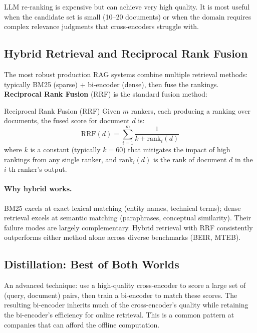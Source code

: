 LLM re-ranking is expensive but can achieve very high quality.  It is most
useful when the candidate set is small (10--20 documents) or when the domain
requires complex relevance judgments that cross-encoders struggle with.

\subsection{Hybrid Retrieval and Reciprocal Rank Fusion}

The most robust production RAG systems combine multiple retrieval methods:
typically BM25 (sparse) + bi-encoder (dense), then fuse the rankings.
\textbf{Reciprocal Rank Fusion} (RRF) is the standard fusion method:

\begin{mathresult}{Reciprocal Rank Fusion (RRF)}
Given $m$ rankers, each producing a ranking over documents, the fused score for
document $d$ is:
\[
    \text{RRF}(d) = \sum_{i=1}^{m} \frac{1}{k + \text{rank}_i(d)}
\]
where $k$ is a constant (typically $k = 60$) that mitigates the impact of high
rankings from any single ranker, and $\text{rank}_i(d)$ is the rank of document
$d$ in the $i$-th ranker's output.
\end{mathresult}

\paragraph{Why hybrid works.}
BM25 excels at exact lexical matching (entity names, technical terms); dense
retrieval excels at semantic matching (paraphrases, conceptual similarity).
Their failure modes are largely complementary.  Hybrid retrieval with RRF
consistently outperforms either method alone across diverse benchmarks (BEIR,
MTEB).

\subsection{Distillation: Best of Both Worlds}

An advanced technique: use a high-quality cross-encoder to score a large set
of (query, document) pairs, then train a bi-encoder to match these scores.
The resulting bi-encoder inherits much of the cross-encoder's quality while
retaining the bi-encoder's efficiency for online retrieval.  This is a common
pattern at companies that can afford the offline computation.


